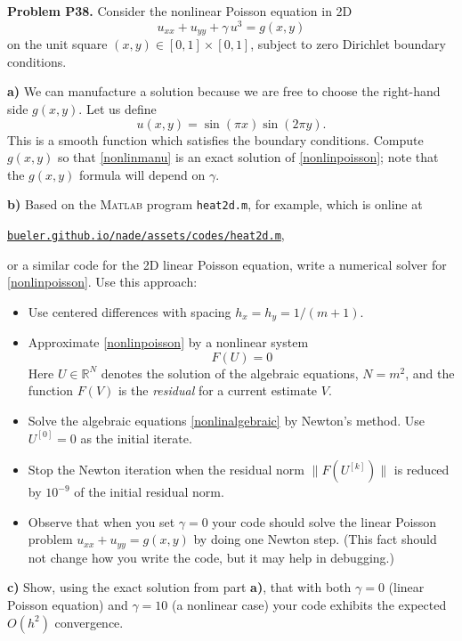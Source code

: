 \documentclass[12pt]{amsart}
\newcommand{\RR}{\mathbb{R}}
\newcommand{\Matlab}{\textsc{Matlab}\xspace}
\newcommand{\prob}[1]{\bigskip\noindent\textbf{#1}\quad }
\newcommand{\epart}[1]{\medskip\noindent\textbf{#1)}\quad }
\begin{document}
\prob{Problem P38.}  Consider the nonlinear Poisson equation in 2D
\begin{equation}
    u_{xx} + u_{yy} + \gamma\, u^3 = g(x,y)  \label{nonlinpoisson}
\end{equation}
on the unit square $(x,y) \in [0,1]\times [0,1]$, subject to zero Dirichlet boundary conditions.

\epart{a}  We can manufacture a solution because we are free to choose the right-hand side $g(x,y)$.  Let us define
\begin{equation}
    u(x,y) = \sin(\pi x) \sin(2\pi y).  \label{nonlinmanu}
\end{equation}
This is a smooth function which satisfies the boundary conditions.  Compute $g(x,y)$ so that \eqref{nonlinmanu} is an exact solution of \eqref{nonlinpoisson}; note that the $g(x,y)$ formula will depend on $\gamma$.

\epart{b}  Based on the \Matlab program \texttt{heat2d.m}, for example, which is online at

\centerline{\href{https://bueler.github.io/nade/assets/codes/heat2d.m}{\texttt{bueler.github.io/nade/assets/codes/heat2d.m}},}

\noindent or a similar code for the 2D linear Poisson equation, write a numerical solver for \eqref{nonlinpoisson}.  Use this approach:
\begin{itemize}
\item Use centered differences with spacing $h_x=h_y=1/(m+1)$.
\item Approximate \eqref{nonlinpoisson} by a nonlinear system
\begin{equation}
    F(U) = 0  \label{nonlinalgebraic}
\end{equation}
Here $U \in \RR^N$ denotes the solution of the algebraic equations, $N=m^2$, and the function $F(V)$ is the \emph{residual} for a current estimate $V$.
\item Solve the algebraic equations \eqref{nonlinalgebraic} by Newton's method.  Use $U^{[0]}=0$ as the initial iterate.
\item Stop the Newton iteration when the residual norm $\|F(U^{[k]})\|$ is reduced by $10^{-9}$ of the initial residual norm.
\item Observe that when you set $\gamma=0$ your code should solve the linear Poisson problem $u_{xx} + u_{yy} = g(x,y)$ by doing one Newton step.  (This fact should not change how you write the code, but it may help in debugging.)
\end{itemize}

\epart{c}  Show, using the exact solution from part \textbf{a)}, that with both $\gamma=0$ (linear Poisson equation) and $\gamma = 10$ (a nonlinear case) your code exhibits the expected $O(h^2)$ convergence.
\end{document}
